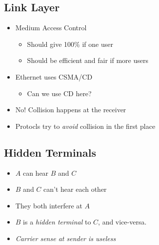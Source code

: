 \subsection{Link Layer}
\begin{itemize}[nosep]
    \item Medium Access Control
          \begin{itemize}[nosep]
              \item Should give 100\% if one user
              \item Should be efficient and fair if more users
          \end{itemize}
    \item Ethernet uses CSMA/CD
          \begin{itemize}[nosep]
              \item Can we use CD here?
          \end{itemize}
    \item No! Collision happens at the receiver
    \item Protocls try to \emph{avoid} collision in the first place
\end{itemize}

\subsection{Hidden Terminals}
\begin{figure}[H]
\end{figure}
\begin{itemize}[nosep]
    \item $A$ can hear $B$ and $C$
    \item $B$ and $C$ can't hear each other
    \item They both interfere at $A$
    \item $B$ is a \emph{hidden terminal} to $C$, and vice-versa.
    \item \emph{Carrier sense at sender is useless}
\end{itemize}

